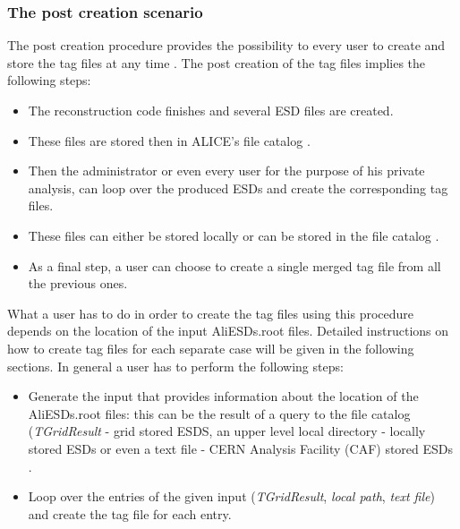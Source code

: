 \documentclass[12pt,a4paper,twoside]{article}
\begin{document}
{\subsubsection{The post creation scenario}

The post creation procedure provides the possibility to every user to
create and store the tag files at any time \cite{EventTagWeb}. The
post creation of the tag files implies the following steps: 

\begin{itemize}

\item The reconstruction code finishes and several ESD files are created. 

\item These files are stored then in ALICE's file catalog \cite{AliEn}. 

\item Then the administrator or even every user for the purpose of his
  private analysis, can loop over the produced ESDs and create the
  corresponding tag files.

\item These files can either be stored locally or can be stored in the
  file catalog \cite{AliEn}.

\item As a final step, a user can choose to create a single merged tag
  file from all the previous ones.

\end{itemize}

What a user has to do in order to create the tag files using this
procedure depends on the location of the input AliESDs.root
files. Detailed instructions on how to create tag files for each
separate case will be given in the following sections. In general a
user has to perform the following steps:

\begin{itemize}

\item Generate the input that provides information about the location
  of the AliESDs.root files: this can be the result of a query to the
  file catalog (\emph{TGridResult} \cite{RootTGridResult} - grid
  stored ESDS, an upper level local directory - locally stored ESDs or
  even a text file - CERN Analysis Facility (CAF) stored ESDs
  \cite{CAF}.

\item Loop over the entries of the given input (\emph{TGridResult},
  \emph{local path}, \emph{text file}) and create the tag file for
  each entry.


\end{itemize}}
\end{document}
